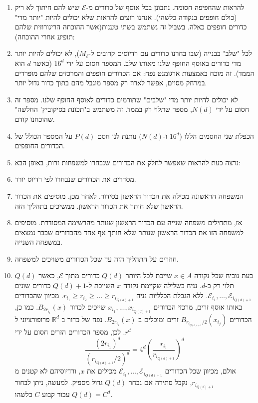 \documentclass{tstextbook}
\begin{document}
\begin{theorem}
\begin{enumerate}
    \item להראות שהחפיפה חסומה. נתבונן בכל אוסף של כדורים מ-\(\mathcal{E}\) שיש להם חיתוך לא ריק (כולם חופפים בנקודה כלשהי). אנחנו רוצים להראות שלא יכולים להיות "יותר מדי" כדורים חופפים כאלה. בשביל זה נשתמש בשתי טענות(אשר ההוכחה הריגורוזית שלהם תופיע אחרי ההוכחה): 


    \item לכל "שלב" בבנייה (שבו בחרנו כדורים עם רדיוסים קרובים ל-\(M_\ell\)), לא יכולים להיות יותר מדי כדורים באוסף החופף שלנו מאותו שלב. המספר חסום על ידי \(16^d\) (כאשר \(d\) הוא הממד). זה מוכח באמצעות ארגומנט נפח: אם הכדורים חופפים והמרכזים שלהם מופרדים במרחק מסוים, אפשר לארוז רק מספר מוגבל מהם בתוך כדור גדול יותר.
    \item לא יכולים להיות יותר מדי "שלבים" שתורמים כדורים לאוסף החופף שלנו. מספר זה חסום על ידי \(N(d)\), מספר שתלוי רק בממד. זה משתמש ב"תכונת בסיקוביץ' החלשה" שהוכחנו קודם.


    \item הכפלת שני החסמים הללו (\(16^d\) ו-\(N(d)\)) נותנת לנו חסם \(P(d)\) על המספר הכולל של הכדורים החופפים. 


    \item נרצה כעת להראות שאפשר לחלק את הכדורים שנבחרו למשפחות זרות, באופן הבא: 


    \item מסדרים את הכדורים שנבחרו לפי רדיוס יורד.    
    \item המשפחה הראשונה מכילה את הכדור הראשון בסידור. לאחר מכן, מוסיפים את הכדור הראשון שלא חותך את הכדור הראשון. ממשיכים בתהליך הזה.
    \item אז, מתחילים משפחה שנייה עם הכדור הראשון שנותר מהרשימה המסודרת. מוסיפים למשפחה הזו את הכדור הראשון שנותר שלא חותך אף אחד מהכדורים שכבר נמצאים במשפחה השנייה.
    \item חוזרים על התהליך הזה עד שכל הכדורים משויכים למשפחה.


    \item כעת נוכיח שכל נקודה \(x \in A\) שייכת לכל היותר \(Q(d)\) כדורים מתוך \(\mathcal{E}\), כאשר \(Q(d)\) תלוי רק ב-\(d\). נניח בשלילה שקיימת נקודה \(x\) השייכת ל-\(Q(d)+1\) כדורים שונים \(\mathcal{E}_{i_1},\dots,\mathcal{E}_{i_{Q(d)+1}}\). ללא הגבלת הכלליות נניח \(r_{i_1} \ge r_{i_2} \ge \dots \ge r_{i_{Q(d)+1}}\). מכיוון שהכדורים באותו אוסף זרים, מרכזי הכדורים \(x_{i_1},...,x_{i_{Q(d)+1}}\) שייכים לכדור \(B_{2r_{i_1}}(x)\). כמו כן, הכדורים \(B_{r_{i_{Q(d)+1}}/2}(x_{i_j})\) זרים ומוכלים ב \(B_{2r_{i_1}}(x)\). 
נפח של כדור ב \(\mathbb{R}^d\) פרופורציוני ל \(r^d\). לכן, מספר הכדורים הזרים חסום על ידי
$$ \frac{(2r_{i_1})^d}{(r_{i_{Q(d)+1}}/2)^d} = 4^d (\frac{r_{i_1}}{r_{i_{Q(d)+1}}})^d $$
אולם, מכיוון שכל הכדורים \(\mathcal{E}_{i_1},\dots,\mathcal{E}_{i_{Q(d)+1}}\) מכילים את \(x\), ורדיוסיהם לא קטנים מ \(r_{i_{Q(d)+1}}\), נקבל סתירה אם נבחר \(Q(d)\) גדול מספיק. למעשה, ניתן לבחור \(Q(d) = C^d\) עבור קבוע \(C\) כלשהו.


  \end{enumerate}
\end{theorem}
\end{document}

